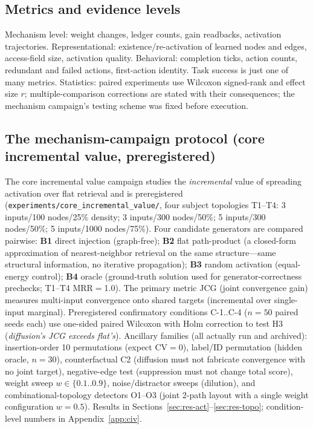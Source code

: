 \documentclass[10pt,a4paper]{article}
\begin{document}
\subsection{Metrics and evidence levels}
Mechanism level: weight changes, ledger counts, gain readbacks, activation trajectories. Representational: existence/re-activation of learned nodes and edges, access-field size, activation quality. Behavioral: completion ticks, action counts, redundant and failed actions, first-action identity. Task success is just one of many metrics. Statistics: paired experiments use Wilcoxon signed-rank and effect size $r$; multiple-comparison corrections are stated with their consequences; the mechanism campaign's testing scheme was fixed before execution.

\subsection{The mechanism-campaign protocol (core incremental value, preregistered)}
\label{sec:method-civ}
The core incremental value campaign studies the \emph{incremental} value of spreading activation over flat retrieval and is preregistered (\texttt{experiments/core\_incremental\_value/}, four subject topologies T1--T4: 3 inputs/100 nodes/25\% density; 3 inputs/300 nodes/50\%; 5 inputs/300 nodes/50\%; 5 inputs/1000 nodes/75\%). Four candidate generators are compared pairwise: \textbf{B1} direct injection (graph-free); \textbf{B2} flat path-product (a closed-form approximation of nearest-neighbor retrieval on the same structure---same structural information, no iterative propagation); \textbf{B3} random activation (equal-energy control); \textbf{B4} oracle (ground-truth solution used for generator-correctness prechecks; T1--T4 MRR$=$1.0). The primary metric JCG (joint convergence gain) measures multi-input convergence onto shared targets (incremental over single-input marginal). Preregistered confirmatory conditions C-1..C-4 ($n{=}50$ paired seeds each) use one-sided paired Wilcoxon with Holm correction to test H3 (\emph{diffusion's JCG exceeds flat's}). Ancillary families (all actually run and archived): insertion-order 10 permutations (expect CV$=$0), label/ID permutation (hidden oracle, $n{=}30$), counterfactual C2 (diffusion must not fabricate convergence with no joint target), negative-edge test (suppression must not change total score), weight sweep $w\in\{0.1..0.9\}$, noise/distractor sweeps (dilution), and combinational-topology detectors O1--O3 (joint 2-path layout with a single weight configuration $w{=}0.5$). Results in Sections~\ref{sec:res-act}--\ref{sec:res-topo}; condition-level numbers in Appendix~\ref{app:civ}.
\end{document}
